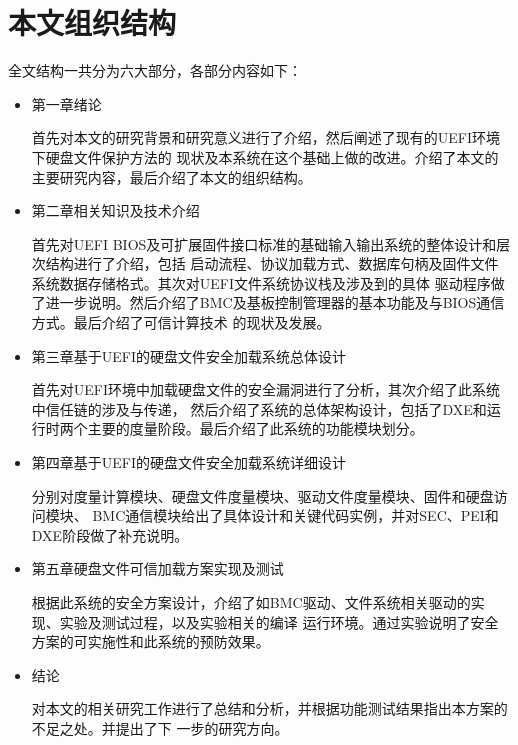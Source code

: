 %
%
\section{本文组织结构}
全文结构一共分为六大部分，各部分内容如下：
\begin{itemize}
\item 第一章\quad 绪论
\par 首先对本文的研究背景和研究意义进行了介绍，然后阐述了现有的UEFI环境下硬盘文件保护方法的
现状及本系统在这个基础上做的改进。介绍了本文的主要研究内容，最后介绍了本文的组织结构。
\item 第二章\quad 相关知识及技术介绍
\par 首先对UEFI BIOS及可扩展固件接口标准的基础输入输出系统的整体设计和层次结构进行了介绍，包括
启动流程、协议加载方式、数据库句柄及固件文件系统数据存储格式。其次对UEFI文件系统协议栈及涉及到的具体
驱动程序做了进一步说明。然后介绍了BMC及基板控制管理器的基本功能及与BIOS通信方式。最后介绍了可信计算技术
的现状及发展。
\item 第三章\quad 基于UEFI的硬盘文件安全加载系统总体设计
\par 首先对UEFI环境中加载硬盘文件的安全漏洞进行了分析，其次介绍了此系统中信任链的涉及与传递，
然后介绍了系统的总体架构设计，包括了DXE和运行时两个主要的度量阶段。最后介绍了此系统的功能模块划分。
\item 第四章\quad 基于UEFI的硬盘文件安全加载系统详细设计
\par 分别对度量计算模块、硬盘文件度量模块、驱动文件度量模块、固件和硬盘访问模块、
BMC通信模块给出了具体设计和关键代码实例，并对SEC、PEI和DXE阶段做了补充说明。
\item 第五章\quad 硬盘文件可信加载方案实现及测试
\par 根据此系统的安全方案设计，介绍了如BMC驱动、文件系统相关驱动的实现、实验及测试过程，以及实验相关的编译
运行环境。通过实验说明了安全方案的可实施性和此系统的预防效果。
\item 结论
\par 对本文的相关研究工作进行了总结和分析，并根据功能测试结果指出本方案的不足之处。并提出了下
一步的研究方向。
\end{itemize}

